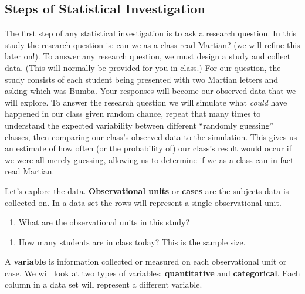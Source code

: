 \documentclass[
]{report}
\providecommand{\tightlist}{%
  \setlength{\itemsep}{0pt}\setlength{\parskip}{0pt}}
\begin{document}
\hypertarget{steps-of-statistical-investigation}{%
\subsection{Steps of Statistical Investigation}\label{steps-of-statistical-investigation}}

The first step of any statistical investigation is to ask a research question. In this study the research question is: can we as a class read Martian? (we will refine this later on!). To answer any research question, we must design a study and collect data. (This will normally be provided for you in class.) For our question, the study consists of each student being presented with two Martian letters and asking which was Bumba. Your responses will become our observed data that we will explore. To answer the research question we will simulate what \emph{could} have happened in our class given random chance, repeat that many times to understand the expected variability between different ``randomly guessing'' classes, then comparing our class's observed data to the simulation. This gives us an estimate of how often (or the probability of) our class's result would occur if we were all merely guessing, allowing us to determine if we as a class can in fact read Martian.

Let's explore the data.
\textbf{Observational units} or \textbf{cases} are the subjects data is collected on. In a data set the rows will represent a single observational unit.

\begin{enumerate}
\def\labelenumi{\arabic{enumi}.}
\tightlist
\item
  What are the observational units in this study?
\end{enumerate}

\vspace{0.5in}

\begin{enumerate}
\def\labelenumi{\arabic{enumi}.}
\setcounter{enumi}{1}
\tightlist
\item
  How many students are in class today? This is the sample size.
\end{enumerate}

\vspace{0.5in}

\newpage

A \textbf{variable} is information collected or measured on each observational unit or case. We will look at two types of variables: \textbf{quantitative} and \textbf{categorical}. Each column in a data set will represent a different variable.
\end{document}
